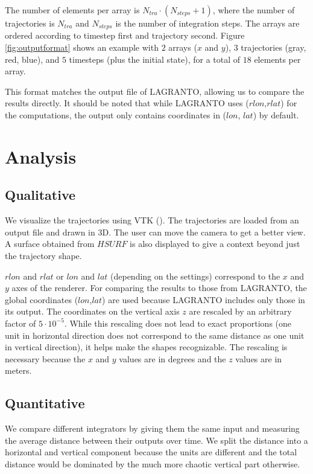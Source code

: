 The number of elements per array is $N_{tra}\cdot(N_{steps}+1)$, where the number of trajectories is $N_{tra}$ and $N_{steps}$ is the number of integration steps. The arrays are ordered according to timestep first and  trajectory second. Figure \ref{fig:outputformat} shows an example with $2$ arrays ($x$ and $y$), $3$ trajectories (gray, red, blue), and $5$ timesteps (plus the initial state), for a total of $18$ elements per array.

This format matches the output file of LAGRANTO, allowing us to compare the results directly. It should be noted that while LAGRANTO uses ($rlon$,$rlat$) for the computations, the output only contains coordinates in ($lon$, $lat$) by default.

\section{Analysis}

\subsection{Qualitative}
We visualize the trajectories using VTK (\cite{src:vtk}). The trajectories are loaded from an output file and drawn in 3D. The user can move the camera to get a better view. A surface obtained from $HSURF$ is also displayed to give a context beyond just the trajectory shape.

$rlon$ and $rlat$ or $lon$ and $lat$ (depending on the settings) correspond to the $x$ and $y$ axes of the renderer. For comparing the results to those from LAGRANTO, the global coordinates ($lon$,$lat$) are used because LAGRANTO includes only those in its output. The coordinates on the vertical axis $z$ are rescaled by an arbitrary factor of $5\cdot 10^{-5}$. While this rescaling does not lead to exact proportions (one unit in horizontal direction does not correspond to the same distance as one unit in vertical direction), it helps make the shapes recognizable. The rescaling is necessary because the $x$ and $y$ values are in degrees and the $z$ values are in meters.

\subsection{Quantitative}
We compare different integrators by giving them the same input and measuring the average distance between their outputs over time. We split the distance into a horizontal and vertical component because the units are different and the total distance would be dominated by the much more chaotic vertical part otherwise.

